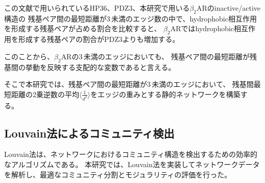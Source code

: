 この文献で用いられているHP36、PDZ3、本研究で用いる$\beta_2$ARのinactive/active構造の
残基ペア間の最短距離が3\,\text{\AA}未満のエッジ数の中で、hydrophobic相互作用を形成する残基ペアが占める割合を比較すると、
$\beta_2$ARではhydrophobic相互作用を形成する残基ペアの割合がPDZ3よりも増加する。

\begin{table}[!ht]
    \centering
    \caption{タンパク質のノード数と、残基ペア間の最短距離が3\,\text{\AA}未満のエッジ数の中でhydrophobic相互作用を形成する残基ペアが占める割合}
    \label{tab:hydrophobic_rate}
  \end{table}


このことから、$\beta_2$ARの3\,\text{\AA}未満のエッジにおいても、
残基ペア間の最短距離が残基間の挙動を反映する支配的な変数であると言える。

そこで本研究では、残基ペア間の最短距離が3\,\text{\AA}未満のエッジにおいて、
残基間最短距離の2乗逆数の平均$\langle \frac{1}{d^2} \rangle$をエッジの重みとする静的ネットワークを構築する。


\subsection{Louvain法によるコミュニティ検出}

Louvain法は、ネットワークにおけるコミュニティ構造を検出するための効率的なアルゴリズムである。
本研究では、Louvain法\cite{Blondel2008}を実装してネットワークデータを解析し、最適なコミュニティ分割とモジュラリティの評価を行った。
